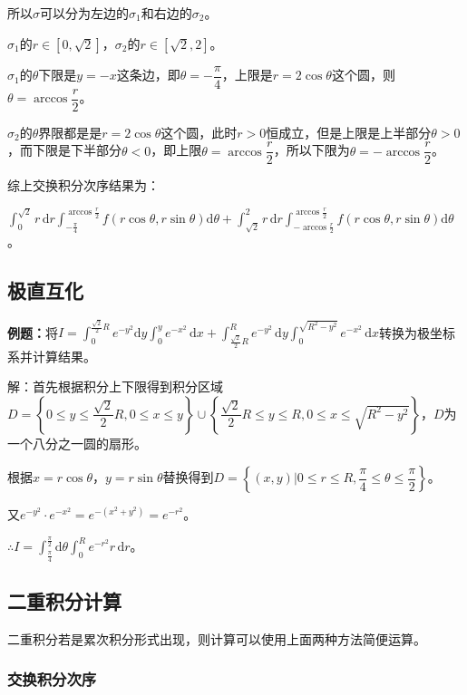 \documentclass[UTF8, 12pt]{ctexart}
\begin{document}
所以$\sigma$可以分为左边的$\sigma_1$和右边的$\sigma_2$。

$\sigma_1$的$r\in[0,\sqrt{2}]$，$\sigma_2$的$r\in[\sqrt{2},2]$。

$\sigma_1$的$\theta$下限是$y=-x$这条边，即$\theta=-\dfrac{\pi}{4}$，上限是$r=2\cos\theta$这个圆，则$\theta=\arccos\dfrac{r}{2}$。

$\sigma_2$的$\theta$界限都是是$r=2\cos\theta$这个圆，此时$r>0$恒成立，但是上限是上半部分$\theta>0$，而下限是下半部分$\theta<0$，即上限$\theta=\arccos\dfrac{r}{2}$，所以下限为$\theta=-\arccos\dfrac{r}{2}$。

综上交换积分次序结果为：

$\int_0^{\sqrt{2}}r\,\textrm{d}r\int_{-\frac{\pi}{4}}^{\arccos\frac{r}{2}}f(r\cos\theta,r\sin\theta)\textrm{d}\theta+\int_{\sqrt{2}}^2r\,\textrm{d}r\int_{-\arccos\frac{r}{2}}^{\arccos\frac{r}{2}}f(r\cos\theta,r\sin\theta)\textrm{d}\theta$。

\subsection{极直互化}

\textbf{例题：}将$I=\int_0^{\frac{\sqrt{2}}{2}R}e^{-y^2}\textrm{d}y\int_0^ye^{-x^2}\,\textrm{d}x+\int_{\frac{\sqrt{2}}{2}R}^Re^{-y^2}\,\textrm{d}y\int_0^{\sqrt{R^2-y^2}}e^{-x^2}\,\textrm{d}x$转换为极坐标系并计算结果。

解：首先根据积分上下限得到积分区域$D=\left\{0\leqslant y\leqslant\dfrac{\sqrt{2}}{2}R,0\leqslant x\leqslant y\right\}\cup\left\{\dfrac{\sqrt{2}}{2}R\leqslant y\leqslant R,0\leqslant x\leqslant\sqrt{R^2-y^2}\right\}$，$D$为一个八分之一圆的扇形。

根据$x=r\cos\theta$，$y=r\sin\theta$替换得到$D=\left\{(x,y)\bigg|0\leqslant r\leqslant R,\dfrac{\pi}{4}\leqslant\theta\leqslant\dfrac{\pi}{2}\right\}$。

又$e^{-y^2}\cdot e^{-x^2}=e^{-(x^2+y^2)}=e^{-r^2}$。

$\therefore I=\int_{\frac{\pi}{4}}^{\frac{\pi}{2}}\textrm{d}\theta\int_0^Re^{-r^2}r\,\textrm{d}r$。

\subsection{二重积分计算}

二重积分若是累次积分形式出现，则计算可以使用上面两种方法简便运算。

\subsubsection{交换积分次序}
\end{document}
